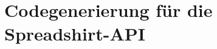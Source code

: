 \chapter{Codegenerierung für die Spreadshirt-API}
\label{chap:generation_for_spreadshirt-api}



%

%
